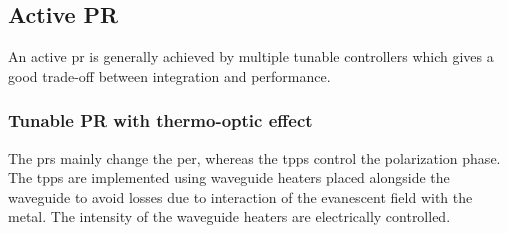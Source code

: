 \documentclass[../report.tex]{subfiles}
\begin{document}
		\subsection{Active PR}\label{sec:active_pr}
An active \gls{pr} is generally achieved by multiple tunable controllers which gives a good trade-off between integration and performance. 
	\subsubsection{Tunable PR with thermo-optic effect} The \gls{pr}s mainly change the \gls{per}, whereas the \gls{tpps} control the polarization phase. The \gls{tpps} are implemented using waveguide heaters placed alongside the waveguide to avoid losses due to interaction of the evanescent field with the metal. The intensity of the waveguide heaters are electrically controlled.	
	
\end{document}

